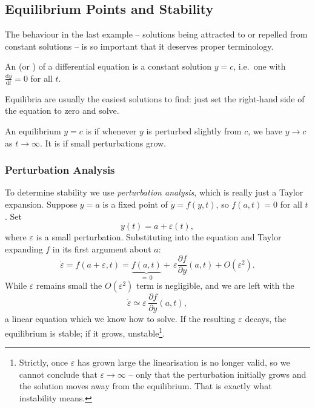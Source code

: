 \subsection{Equilibrium Points and Stability}

The behaviour in the last example -- solutions being attracted to or repelled from constant solutions -- is so important that it deserves proper terminology.

\begin{definition}
	An  (or ) of a differential equation is a constant solution $y = c$, i.e.\ one with $\frac{\mathrm{d}y}{\mathrm{d}t} = 0$ for all $t$.
\end{definition}

Equilibria are usually the easiest solutions to find: just set the right-hand side of the equation to zero and solve.

\begin{definition}[Stability]
	An equilibrium $y = c$ is  if whenever $y$ is perturbed slightly from $c$, we have $y \to c$ as $t \to \infty$. It is  if small perturbations grow.
\end{definition}

\subsubsection{Perturbation Analysis}

To determine stability we use \emph{perturbation analysis}, which is really just a Taylor expansion. Suppose $y = a$ is a fixed point of $\dot{y} = f(y, t)$, so $f(a, t) = 0$ for all $t$. Set
$$
y(t) = a + \varepsilon(t),
$$
where $\varepsilon$ is a small perturbation. Substituting into the equation and Taylor expanding $f$ in its first argument about $a$:
$$
\dot{\varepsilon} = f(a + \varepsilon, t) = \underbrace{f(a, t)}_{= \, 0} + \, \varepsilon \frac{\partial f}{\partial y}(a, t) + O(\varepsilon^2).
$$
While $\varepsilon$ remains small the $O(\varepsilon^2)$ term is negligible, and we are left with the 
$$
\dot{\varepsilon} \simeq \varepsilon \, \frac{\partial f}{\partial y}(a, t),
$$
a linear equation which we know how to solve. If the resulting $\varepsilon$ decays, the equilibrium is stable; if it grows, unstable\footnote{Strictly, once $\varepsilon$ has grown large the linearisation is no longer valid, so we cannot conclude that $\varepsilon \to \infty$ -- only that the perturbation initially grows and the solution moves away from the equilibrium. That is exactly what instability means.}.

